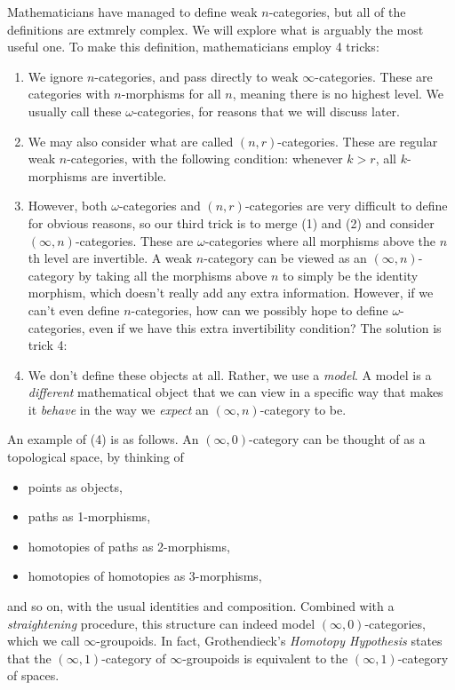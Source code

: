 Mathematicians have managed to define weak $n$-categories, but all of the definitions are extmrely complex. We will explore what is arguably the most useful one. To make this definition, mathematicians employ 4 tricks:
\begin{enumerate}
	\item We ignore $n$-categories, and pass directly to weak $\infty $-categories. These are categories with $n$-morphisms for all $n$, meaning there is no highest level. We usually call these $\omega $-categories, for reasons that we will discuss later.
	\item We may also consider what are called $(n,r)$-categories. These are regular weak $n$-categories, with the following condition: whenever $k>r$, all $k$-morphisms are invertible.
	\item However, both $\omega $-categories and $(n,r)$-categories are very difficult to define for obvious reasons, so our third trick is to merge (1) and (2) and consider $(\infty ,n)$-categories. These are $\omega $-categories where all morphisms above the $n$th level are invertible. A weak $n$-category can be viewed as an $(\infty ,n)$-category by taking all the morphisms above $n$ to simply be the identity morphism, which doesn't really add any extra information. However, if we can't even define $n$-categories, how can we possibly hope to define $\omega $-categories, even if we have this extra invertibility condition? The solution is trick 4:
	\item We don't define these objects at all. Rather, we use a \emph{model}. A model is a \emph{different} mathematical object that we can view in a specific way that makes it \emph{behave} in the way we \emph{expect} an $(\infty ,n)$-category to be.
\end{enumerate}

An example of (4) is as follows. An $(\infty ,0)$-category can be thought of as a topological space, by thinking of
\begin{itemize}
	\item points as objects,
	\item paths as 1-morphisms,
	\item homotopies of paths as 2-morphisms,
	\item homotopies of homotopies as 3-morphisms,
\end{itemize}
and so on, with the usual identities and composition. Combined with a \emph{straightening} procedure, this structure can indeed model $(\infty ,0)$-categories, which we call $\infty $-groupoids. In fact, Grothendieck's \emph{Homotopy Hypothesis} states that the $(\infty ,1)$-category of $\infty $-groupoids is equivalent to the $(\infty ,1)$-category of spaces.

